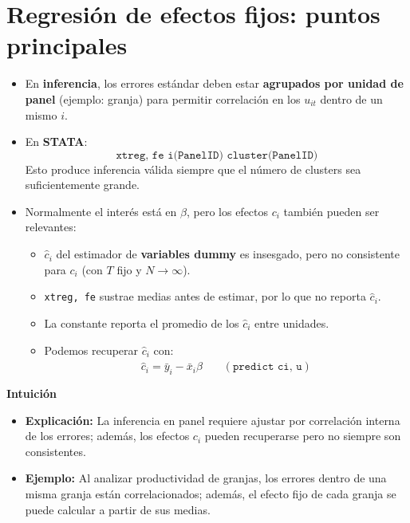 \documentclass[12pt]{article}
\begin{document}
\section*{\noindent\textbf{Regresión de efectos fijos: puntos principales}}

\begin{itemize}
    \item En \textbf{inferencia}, los errores estándar deben estar \textbf{agrupados por unidad de panel} (ejemplo: granja) para permitir correlación en los $u_{it}$ dentro de un mismo $i$.
    
    \item En \textbf{STATA}:  
    \[
    \texttt{xtreg, fe i(PanelID) cluster(PanelID)}
    \]
    Esto produce inferencia válida siempre que el número de clusters sea suficientemente grande.
    
    \item Normalmente el interés está en $\beta$, pero los efectos $c_i$ también pueden ser relevantes:
    \begin{itemize}
        \item $\hat{c}_i$ del estimador de \textbf{variables dummy} es insesgado, pero no consistente para $c_i$ (con $T$ fijo y $N \to \infty$).
        \item \texttt{xtreg, fe} sustrae medias antes de estimar, por lo que no reporta $\hat{c}_i$.
        \item La constante reporta el promedio de los $\hat{c}_i$ entre unidades.
        \item Podemos recuperar $\hat{c}_i$ con:  
        \[
        \hat{c}_i = \bar{y}_i - \bar{x}_i \hat{\beta}
        \quad \; \; \; (\texttt{predict ci, u})
        \]
    \end{itemize}
\end{itemize}

\noindent\textbf{Intuición}
\begin{itemize}
    \item \textbf{Explicación:} La inferencia en panel requiere ajustar por correlación interna de los errores; además, los efectos $c_i$ pueden recuperarse pero no siempre son consistentes.
    \item \textbf{Ejemplo:} Al analizar productividad de granjas, los errores dentro de una misma granja están correlacionados; además, el efecto fijo de cada granja se puede calcular a partir de sus medias.
\end{itemize}
\end{document}
